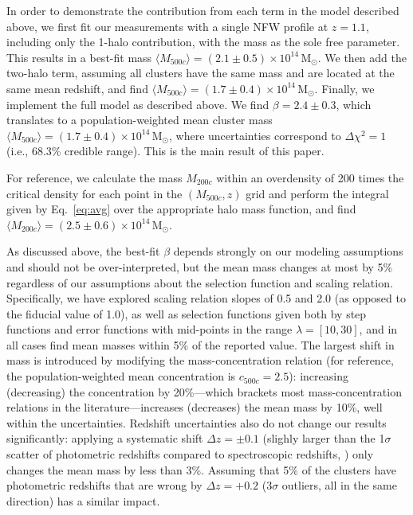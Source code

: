 \documentclass[preprint2]{aastex63}
\newcommand{\meanmass}{1.7\pm0.4}
\newcommand{\Msun}{\mathrm{M}_\odot}
\begin{document}
In order to demonstrate the contribution from each term in the model described above, we first fit our measurements with a single NFW profile at $z=1.1$, including only the 1-halo contribution, with the mass as the sole free parameter. This results in a best-fit mass $\langle M_{500c}\rangle=\left(2.1\pm0.5\right)\times10^{14}\,\Msun$. We then add the two-halo term, assuming all clusters have the same mass and are located at the same mean redshift, and find $\langle M_{500c}\rangle=\left(1.7\pm0.4\right)\times10^{14}\,\Msun$.
%
Finally, we implement the full model as described above. We find $\beta=2.4\pm0.3$, which translates to a population-weighted mean cluster mass $\langle M_{500c}\rangle = \left(\meanmass\right)\times10^{14}\,\Msun$, where uncertainties correspond to $\Delta\chi^2=1$ (i.e., 68.3\% credible range). This is the main result of this paper.

For reference, we calculate the mass $M_{200c}$ within an overdensity of 200 times the critical density for each point in the $(M_{500c},z)$ grid and perform the integral given by Eq.\ \ref{eq:avg} over the appropriate halo mass function, and find $\langle M_{200c}\rangle=(2.5\pm0.6)\times10^{14}\,\Msun$.

As discussed above, the best-fit $\beta$ depends strongly on our modeling assumptions and should not be over-interpreted, but the mean mass changes at most by 5\% regardless of our assumptions about the selection function and scaling relation. Specifically, we have explored scaling relation slopes of 0.5 and 2.0 (as opposed to the fiducial value of 1.0), as well as selection functions given both by step functions and error functions with mid-points in the range $\lambda=[10,30]$, and in all cases find mean masses within 5\% of the reported value. The largest shift in mass is introduced by modifying the mass-concentration relation (for reference, the population-weighted mean concentration is $c_{500c}=2.5$): increasing (decreasing) the concentration by 20\%---which brackets most mass-concentration relations in the literature---increases (decreases) the mean mass by 10\%, well within the uncertainties. Redshift uncertainties also do not change our results significantly: applying a systematic shift $\Delta z=\pm0.1$ (slighly larger than the 1$\sigma$ scatter of photometric redshifts compared to spectroscopic redshifts, \cite{gonzalez19}) only changes the mean mass by less than 3\%. Assuming that 5\% of the clusters have photometric redshifts that are wrong by $\Delta z=+0.2$ ($3\sigma$ outliers, all in the same direction) has a similar impact. 
\end{document}
